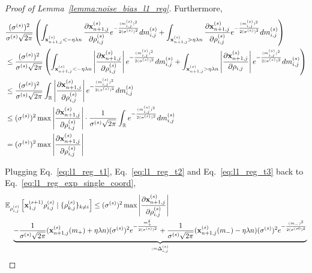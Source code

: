 \begin{proof}[Proof of Lemma~\ref{lemma:noise_bias_l1_reg}]
Furthermore,
\begin{align}
    &\frac{(\sigma^{(s)})^2}{\sigma^{(s)} \sqrt{2\pi}}\left(
    \int_{{\mathbf{x}}_{n+1,j}^{(s)} < - \eta \lambda n} \frac{\partial {\mathbf{x}}_{n+1,j}^{(s)}}{\partial \rho_{i, j}^{(s)} } e^{-\frac{(m_{i,j}^{(s)})^2}{2 (\sigma^{(s)})^2}}dm_{i,j}^{(s)}
    + \int_{{\mathbf{x}}_{n+1,j}^{(s)} > \eta \lambda n} \frac{\partial {\mathbf{x}}_{n+1,j}^{(s)}}{\partial \rho_{i, j}^{(s)} } e^{-\frac{(m_{i,j}^{(s)})^2}{2(\sigma^{(s)})^2}} dm_{i,j}^{(s)}
    \right)\\
    \nonumber
    &\leq \frac{(\sigma^{(s)})^2}{\sigma^{(s)} \sqrt{2\pi}}\left(
    \int_{{\mathbf{x}}_{n+1,j}^{(s)} < - \eta \lambda n} \left|\frac{\partial {\mathbf{x}}_{n+1,j}^{(s)}}{\partial \rho_{i, j}^{(s)} }\right| e^{-\frac{(m_{i,j}^{(s)})^2}{2(\sigma^{(s)})^2}}dm_{i,j}^{(s)}
    + \int_{{\mathbf{x}}_{n+1,j}^{(s)} > \eta \lambda n} \left|\frac{\partial {\mathbf{x}}_{n+1,j}^{(s)}}{\partial \rho_{i, j}} \right| e^{-\frac{(m_{i,j}^{(s)})^2}{2(\sigma^{(s)})^2}} dm_{i,j}^{(s)}
    \right)\\
    &\leq \frac{(\sigma^{(s)})^2}{\sigma^{(s)} \sqrt{2\pi}}
    \int_{\mathbb{R}} \left| \frac{\partial {\mathbf{x}}_{n+1,j}^{(s)}}{\partial \rho_{i,j}^{(s)}} \right| e^{-\frac{(m_{i,j}^{(s)})^2}{2 (\sigma^{(s)})^2}}
    d m_{i,j}^{(s)}\\
    &\leq (\sigma^{(s)})^2 \max\left| \frac{\partial {\mathbf{x}}_{n+1,j}^{(s)}}{\partial \rho_{i, j}^{(s)}} \right|\cdot \frac{1}{\sigma^{(s)}\sqrt{2\pi}} \int_{\mathbb{R}} e^{-\frac{(m_{i,j}^{(s)})^2}{2(\sigma^{(s)})^2}} d m_{i,j}^{(s)}\\
\label{eq:l1_reg_t3}
    &= (\sigma^{(s)})^2 \max\left| \frac{\partial {\mathbf{x}}_{n+1,j}^{(s)}}{\partial \rho_{i, j}^{(s)}} \right|
\end{align}

Plugging Eq.~\ref{eq:l1_reg_t1}, Eq.~\ref{eq:l1_reg_t2} and Eq.~\ref{eq:l1_reg_t3} back to Eq.~\ref{eq:l1_reg_exp_single_coord},
\begin{align}
    &\mathbb{E}_{\rho_{i,j}^{(s)}}\left[{\mathbf{x}}_{1,j}^{(s+1)} \rho_{i, j}^{(s)} \mid \{\rho_{k, j}^{(s)}\}_{k \neq i} \right]
    \leq (\sigma^{(s)})^2 \max\left| \frac{\partial {\mathbf{x}}_{n+1,j}^{(s)}}{\partial \rho_{i, j}^{(s)} } \right|\\
    \nonumber
    &\quad \underbrace{-\frac{1}{\sigma^{(s)}\sqrt{2\pi}}({\mathbf{x}}_{n+1,j}^{(s)}(m_{+}) + \eta \lambda n) (\sigma^{(s)})^2 e^{-\frac{m_{+}^2}{2(\sigma^{(s)})^2}}
    + \frac{1}{\sigma^{(s)} \sqrt{2\pi}} ({\mathbf{x}}_{n+1,j}^{(s)}(m_{-}) - \eta \lambda n) (\sigma^{(s)})^2 e^{-\frac{(m_{-})^{2}}{2 (\sigma^{(s0})^2}}
    }_{:= \Delta_{i,j}^{(s)}}
\end{align}


\end{proof}
